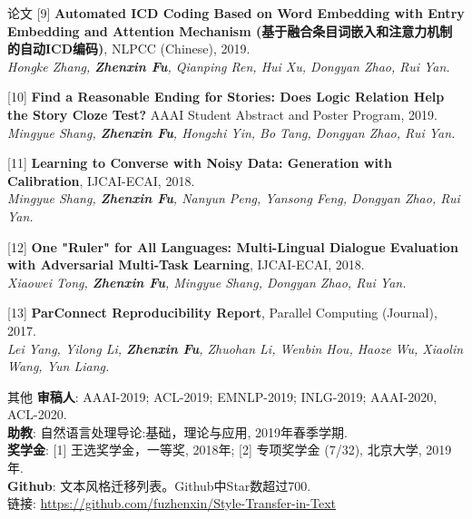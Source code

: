 \documentclass{resume} %
\begin{document}
\begin{rSection}{论文}
    [9] \textbf{Automated ICD Coding Based on Word Embedding with Entry Embedding and Attention Mechanism (基于融合条目词嵌入和注意力机制的自动ICD编码)}, NLPCC (Chinese), 2019. \\
    {\it Hongke Zhang, \textbf{Zhenxin Fu}, Qianping Ren, Hui Xu, Dongyan Zhao, Rui Yan.}

    [10] \textbf{Find a Reasonable Ending for Stories: Does Logic Relation Help the Story Cloze Test?} AAAI Student Abstract and Poster Program, 2019. \\
    {\it Mingyue Shang, \textbf{Zhenxin Fu}, Hongzhi Yin, Bo Tang, Dongyan Zhao, Rui Yan.}

    [11] \textbf{Learning to Converse with Noisy Data: Generation with Calibration}, IJCAI-ECAI, 2018. \\
    {\it Mingyue Shang, \textbf{Zhenxin Fu}, Nanyun Peng, Yansong Feng, Dongyan Zhao, Rui Yan.} 

    [12] \textbf{One "Ruler" for All Languages: Multi-Lingual Dialogue Evaluation with Adversarial Multi-Task Learning}, IJCAI-ECAI, 2018. \\
    {\it Xiaowei Tong, \textbf{Zhenxin Fu}, Mingyue Shang, Dongyan Zhao, Rui Yan.}

    [13] \textbf{ParConnect Reproducibility Report}, Parallel Computing (Journal), 2017.\\
    {\it Lei Yang, Yilong Li, \textbf{Zhenxin Fu}, Zhuohan Li, Wenbin Hou, Haoze Wu, Xiaolin Wang, Yun Liang.}
    
\end{rSection}
    
    
\begin{rSection}{其他}
    \textbf{审稿人}: AAAI-2019; ACL-2019; EMNLP-2019; INLG-2019; AAAI-2020, ACL-2020. \\
    \textbf{助教}: 自然语言处理导论:基础，理论与应用, 2019年春季学期. \\
    \textbf{奖学金}: [1] 王选奖学金，一等奖, 2018年; [2] 专项奖学金 (7/32), 北京大学, 2019年. \\
    \textbf{Github}: 文本风格迁移列表。Github中Star数超过700. \\链接: \url{https://github.com/fuzhenxin/Style-Transfer-in-Text}
\end{rSection}
\end{document}
